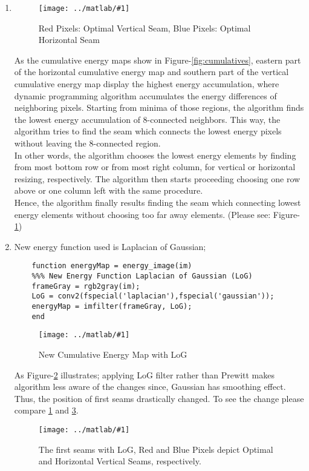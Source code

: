 \documentclass{article}
\newcommand{\listFigure}[3]{ \begin{figure}[H]
\texttt{[image: ../matlab/\#1]}
		\caption{#2\label{fig:#3}}
	\end{figure}		
}
\begin{document}
\begin{enumerate}
	\item
	\listFigure{seams.png}{Red Pixels: Optimal Vertical Seam, Blue
	Pixels: Optimal Horizontal Seam}{seams}
	As the cumulative energy maps show in Figure-\ref{fig:cumulatives}, eastern
	part of the horizontal cumulative energy map and southern part of the vertical
	cumulative energy map display the highest energy accumulation, where dynamic
	programming algorithm accumulates the energy differences of neighboring pixels.
	Starting from minima of those regions, the algorithm finds the lowest energy
	accumulation of 8-connected neighbors. This way, the algorithm tries to find
	the seam which connects the lowest energy pixels without leaving the
	8-connected region. \\
	In other words, the algorithm chooses the lowest energy
	elements by finding from most bottom row or from most right column, for
	vertical or horizontal resizing, respectively. The algorithm then starts proceeding
	choosing one row above or one column left with the same procedure. \\
	Hence, the algorithm finally results finding the seam which connecting lowest
	energy elements without choosing too far away elements.
	(Please see: Figure-\ref{fig:seams})
	\item
	New energy function used is Laplacian of Gaussian;
	\begin{lstlisting}
	function energyMap = energy_image(im)
	%%% New Energy Function Laplacian of Gaussian (LoG)
	frameGray = rgb2gray(im);  
	LoG = conv2(fspecial('laplacian'),fspecial('gaussian'));
	energyMap = imfilter(frameGray, LoG); 
	end		
	\end{lstlisting}	
	\listFigure{cumulatives-2.png}{New Cumulative Energy Map with
	LoG}{cumulatives2}
	As Figure-\ref{fig:cumulatives2} illustrates; applying LoG filter rather than
	Prewitt makes algorithm less aware of the changes since, Gaussian has smoothing
	effect. Thus, the position of first seams drastically changed. To see the
	change please compare \ref{fig:seams} and \ref{fig:seams2}.
    \listFigure{seams-2.png}{The first seams with LoG, Red and Blue Pixels
    depict Optimal and Horizontal Vertical Seams, respectively.}{seams2}
    

\end{enumerate}
\end{document}
